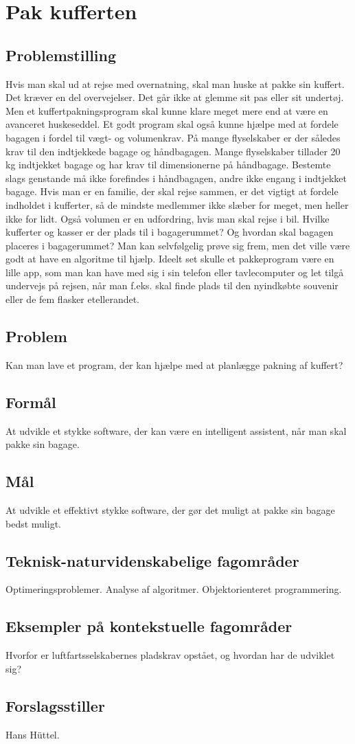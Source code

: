 \chapter{Pak kufferten}
\label{chap:forslag}
\section*{Problemstilling}
Hvis man skal ud at rejse med overnatning, skal man huske at pakke sin kuffert. Det kræver en del overvejelser. Det går ikke at glemme sit pas eller sit undertøj.
Men et kuffertpakningsprogram skal kunne klare meget mere end at være en avanceret huskeseddel. Et godt program skal også kunne hjælpe med at fordele bagagen i fordel til vægt- og volumenkrav.
På mange flyselskaber er der således krav til den indtjekkede bagage og håndbagagen. Mange flyselskaber tillader 20 kg indtjekket bagage og har krav til dimensionerne på håndbagage. Bestemte slags genstande må ikke forefindes i håndbagagen, andre ikke engang i indtjekket bagage.
Hvis man er en familie, der skal rejse sammen, er det vigtigt at fordele indholdet i kufferter, så de mindste medlemmer ikke slæber for meget, men heller ikke for lidt. Også volumen er en udfordring, hvis man skal rejse i bil.
Hvilke kufferter og kasser er der plads til i bagagerummet? Og hvordan skal bagagen placeres i bagagerummet? Man kan selvfølgelig prøve sig frem, men det ville være godt at have en algoritme til hjælp. Ideelt set skulle et pakkeprogram være en lille app, som man kan have med sig i sin telefon eller tavlecomputer og let tilgå undervejs på rejsen, når man f.eks. skal finde plads til den nyindkøbte souvenir eller de fem flasker etellerandet.
\section*{Problem}
Kan man lave et program, der kan hjælpe med at planlægge pakning af kuffert?
\section*{Formål}
At udvikle et stykke software, der kan være en intelligent assistent, når man skal pakke sin bagage.
\section*{Mål}
At udvikle et effektivt stykke software, der gør det muligt at pakke sin bagage
bedst muligt.
\section*{Teknisk-naturvidenskabelige fagområder}
Optimeringsproblemer. Analyse af algoritmer. Objektorienteret programmering.
\section*{Eksempler på kontekstuelle fagområder}
Hvorfor er luftfartsselskabernes pladskrav opstået, og hvordan har de udviklet
sig?
\section*{Forslagsstiller}
Hans Hüttel.